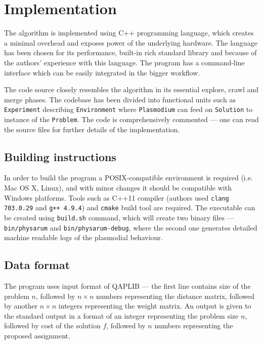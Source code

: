 \section{Implementation}
\label{section:project_implementation}

The algorithm is implemented using C++ programming language, which creates a minimal overhead and exposes power of the underlying hardware. The language has been chosen for its performance, built-in rich standard library and because of the authors' experience with this language. The program has a command-line interface which can be easily integrated in the bigger workflow.

The code source closely resembles the algorithm in its essential explore, crawl and merge phases. The codebase has been divided into functional units such as \texttt{Experiment} describing \texttt{Environment} where \texttt{Plasmodium} can feed on \texttt{Solution} to instance of the \texttt{Problem}. The code is comprehensively commented --- one can read the source files for further details of the implementation.

\subsection{Building instructions}

In order to build the program a POSIX-compatible environment is required (i.e. Mac OS X, Linux), and with minor changes it should be compatible with Windows platforms. Tools such as C++11 compiler (authors used \texttt{clang 703.0.29} and \texttt{g++ 4.9.4}) and \texttt{cmake} build tool are required. The executable can be created using \texttt{build.sh} command, which will create two binary files --- \texttt{bin/physarum} and \texttt{bin/physarum-debug}, where the second one generates detailed machine readable logs of the plasmodial behaviour.

\subsection{Data format}

The program uses input format of QAPLIB \cite{burkard1997qaplib} --- the first line contains size of the problem $n$, followed by $n{\times}n$ numbers representing the distance matrix, followed by another $n{\times}n$ integers representing the weight matrix. An output is given to the standard output in a format of an integer representing the problem size $n$, followed by cost of the solution $f$, followed by $n$ numbers representing the proposed assignment.

